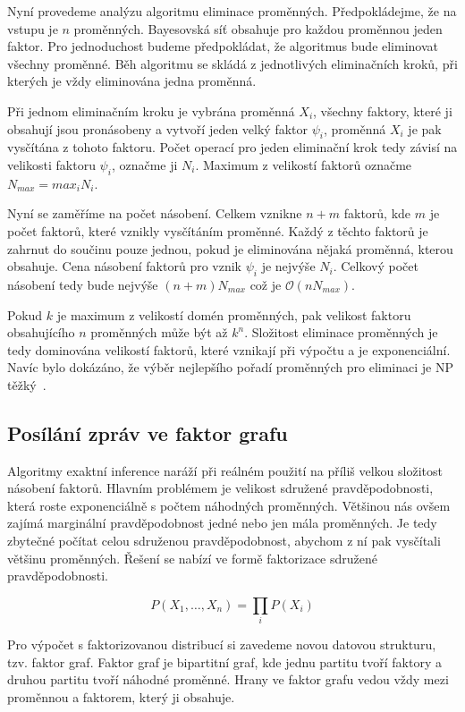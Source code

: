 Nyní provedeme analýzu algoritmu eliminace proměnných.
Předpokládejme, že na vstupu je $n$ proměnných.
Bayesovská síť obsahuje pro každou proměnnou jeden faktor.
Pro jednoduchost budeme předpokládat, že algoritmus bude eliminovat všechny proměnné.
Běh algoritmu se skládá z jednotlivých eliminačních kroků, při kterých je vždy eliminována jedna proměnná.

Při jednom eliminačním kroku je vybrána proměnná $X_i$, všechny faktory, které ji obsahují jsou pronásobeny a vytvoří jeden velký faktor $\psi_i$, proměnná $X_i$ je pak vysčítána z tohoto faktoru.
Počet operací pro jeden eliminační krok tedy závisí na velikosti faktoru $\psi_i$, označme ji $N_i$.
Maximum z velikostí faktorů označme $N_{max} = max_i N_i$.

Nyní se zaměříme na počet násobení.
Celkem vznikne $n+m$ faktorů, kde $m$ je počet faktorů, které vznikly vysčítáním proměnné.
Každý z těchto faktorů je zahrnut do součinu pouze jednou, pokud je eliminována nějaká proměnná, kterou obsahuje.
Cena násobení faktorů pro vznik $\psi_i$ je nejvýše $N_i$.
Celkový počet násobení tedy bude nejvýše $(n+m)N_{max}$ což je $\mathcal{O}(nN_{max})$.

Pokud $k$ je maximum z velikostí domén proměnných, pak velikost faktoru obsahujícího $n$ proměnných může být až $k^n$.
Složitost eliminace proměnných je tedy dominována velikostí faktorů, které vznikají při výpočtu a je exponenciální.
Navíc bylo dokázáno, že výběr nejlepšího pořadí proměnných pro eliminaci je NP těžký~\cite{arnborg1987complexity}.

\subsection{Posílání zpráv ve faktor grafu}

Algoritmy exaktní inference naráží při reálném použití na příliš velkou složitost násobení faktorů.
Hlavním problémem je velikost sdružené pravděpodobnosti, která roste exponenciálně s počtem náhodných proměnných.
Většinou nás ovšem zajímá marginální pravděpodobnost jedné nebo jen mála proměnných.
Je tedy zbytečné počítat celou sdruženou pravděpodobnost, abychom z ní pak vysčítali většinu proměnných.
Řešení se nabízí ve formě faktorizace sdružené pravděpodobnosti.

\begin{equation*}
    P(X_1, \dots, X_n) = \prod_i P(X_i)
\end{equation*}

Pro výpočet s faktorizovanou distribucí si zavedeme novou datovou strukturu, tzv. faktor graf.
Faktor graf je bipartitní graf, kde jednu partitu tvoří faktory a druhou partitu tvoří náhodné proměnné.
Hrany ve faktor grafu vedou vždy mezi proměnnou a faktorem, který ji obsahuje.

